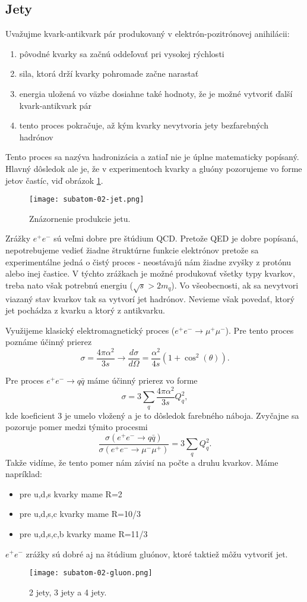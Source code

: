 \documentclass[../../main.tex]{subfiles}
\begin{document}
\subsection{Jety}
Uvažujme kvark-antikvark pár produkovaný v elektrón-pozitrónovej anihilácii:
\begin{enumerate}
\item pôvodné kvarky sa začnú oddeľovať pri vysokej rýchlosti
\item sila, ktorá drží kvarky pohromade začne narastať 
\item energia uložená vo väzbe dosiahne také hodnoty, že je možné vytvoriť ďalší kvark-antikvark pár
\item tento proces pokračuje, až kým kvarky nevytvoria jety bezfarebných hadrónov
\end{enumerate}
Tento proces sa nazýva hadronizácia a zatiaľ nie je úplne matematicky popísaný. Hlavný dôsledok ale je, že v experimentoch kvarky a gluóny pozorujeme vo forme jetov častíc, viď obrázok \ref{sf2:fig:jet}.

\begin{figure}[!h]
\texttt{[image: subatom-02-jet.png]}
\centering
\caption{Znázornenie produkcie jetu.}
\label{sf2:fig:jet}
\end{figure}

Zrážky $e^+e^-$ sú veľmi dobre pre štúdium QCD. Pretože QED je dobre popísaná, nepotrebujeme vedieť žiadne štruktúrne funkcie elektrónov pretože sa experimentálne jedná o čistý proces - neostávajú nám žiadne zvyšky z protónu alebo inej častice.
V týchto zrážkach je možné produkovať všetky typy kvarkov, treba nato však potrebnú energiu ($\sqrt{s}>2m_q$). Vo všeobecnosti, ak sa nevytvori viazaný stav kvarkov tak sa vytvorí jet hadrónov. Nevieme však povedať, ktorý jet pochádza z kvarku a ktorý z antikvarku. 

Využijeme klasický elektromagnetický proces ($e^+e^- \rightarrow \mu^+ \mu^-$).  Pre tento proces poznáme účinný prierez 
$$ \sigma = \frac{4\pi \alpha^2}{3s} \rightarrow \frac{d\sigma}{d\Omega} = \frac{\alpha^2}{4s}(1+\cos^2(\theta)).$$

Pre proces $e^+e^- \rightarrow q \bar{q}$ máme účinný prierez vo forme
$$ \sigma = 3 \sum_q \frac{4\pi \alpha^2}{3s} Q^2_q,$$ 
kde koeficient 3 je umelo vložený a je to dôsledok farebného náboja. Zvyčajne sa pozoruje pomer medzi týmito procesmi 
$$ \frac{\sigma(e^+e^- \rightarrow q\bar{q})}{\sigma(e^+e^- \rightarrow \mu^-\mu^+)} = 3 \sum_q Q^2_q.$$
Takže vidíme, že tento pomer nám závisí na počte a druhu kvarkov. Máme napríklad:
\begin{itemize}
\item pre u,d,s kvarky mame R=2
\item pre u,d,s,c kvarky mame R=10/3
\item pre u,d,s,c,b kvarky mame R=11/3
\end{itemize}

$e^+e^-$ zrážky sú dobré aj na štúdium gluónov, ktoré taktiež môžu vytvoriť jet. 

\begin{figure}[!h]
\texttt{[image: subatom-02-gluon.png]}
\centering
\caption{2 jety, 3 jety a 4 jety.}
\label{sf2:fig:gluon}
\end{figure}
\end{document}
